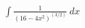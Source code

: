 \documentclass[preview]{standalone}
\begin{document}
\begin{align*}
\int \frac{1}{(16-4x^2)^(3/2)} \ dx
\end{align*}
\end{document}
